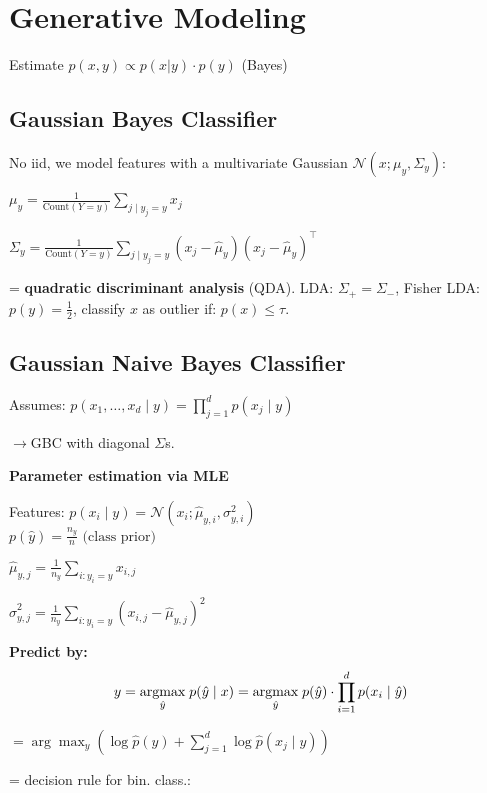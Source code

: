\section*{Generative Modeling}

Estimate $p(x,y) \propto p(x|y) \cdot p(y)$  (Bayes)

\subsection*{Gaussian Bayes Classifier}

No iid,  we model features with a multivariate Gaussian $\mathcal{N}(x; \mu_y, \Sigma_y)$:

\quad $\mu_{y} = \frac{1}{\text{Count}(Y = y)} \sum_{j \; | \; y_j = y} x_{j}$

\quad $\Sigma_{y} = \frac{1}{\text{Count}(Y = y)} \sum_{j \; | \; y_j = y} (x_{j} - \hat \mu_{y}) (x_{j} - \hat \mu_{y})^\top$

= \textbf{quadratic discriminant analysis} (QDA). LDA: $\Sigma_+ = \Sigma_-$, Fisher LDA: $p(y) = \frac{1}{2}$, classify $x$ as outlier if: $p(x) \leq \tau$.

\subsection*{Gaussian Naive Bayes Classifier}
Assumes: $p(x_1, \ldots, x_d \mid y) = \prod_{j=1}^{d} p(x_j \mid y)$

$\rightarrow$GBC with diagonal $\Sigma$s. 

\textbf{Parameter estimation via MLE}

Features: $p(x_i \; | \; y) = \mathcal{N}(x_i; \hat \mu_{y,i}, \sigma^2_{y,i})$ \\[-6pt]

\quad \quad$p(\hat{y}) = \frac{n_y}{n} \text{ (class prior)}$

\quad \quad$\hat{\mu}_{y,j} = \frac{1}{n_y} \sum_{i: y_i = y} x_{i,j}$

\quad \quad$\hat{\sigma}^2_{y,j} = \frac{1}{n_y} \sum_{i: y_i = y} \left( x_{i,j} - \hat{\mu}_{y,j} \right)^2$

\textbf{Predict by:} \\[-20pt]
$$y = \underset{\hat y}{\text{argmax}} \; p(\hat y \; | \; x) = \underset{\hat y}{\text{argmax}} \; p(\hat y) \cdot \prod_{i=1}^d p(x_i \; | \; \hat y) $$


$= \arg \max_{y} \left( \log \hat{p}(y) + \sum_{j=1}^{d} \log \hat{p}(x_j \mid y) \right)
$

= decision rule for bin. class.: \\[-8pt]

